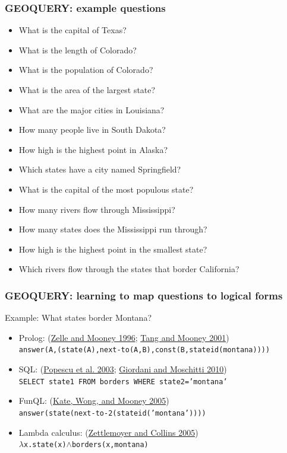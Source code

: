\documentclass[ignorenonframetext]{beamer}
\begin{document}
\begin{frame}\frametitle{GEOQUERY: example questions}
\begin{itemize}
\item What is the capital of Texas?
\item What is the length of Colorado?
\item What is the population of Colorado?
\item What is the area of the largest state?
\item What are the major cities in Louisiana?
\item How many people live in South Dakota?
\item How high is the highest point in Alaska?
\item Which states have a city named Springfield?
\item What is the capital of the most populous state?
\item How many rivers flow through Mississippi?
\item How many states does the Mississippi run through?
\item How high is the highest point in the smallest state?
\item Which rivers flow through the states that border California?
\end{itemize}
\end{frame}

\begin{frame}\frametitle{GEOQUERY: learning to map questions to logical forms}
Example: What states border Montana?
\begin{itemize}
\item Prolog:
(\href{http://aaaipress.org/Papers/AAAI/1996/AAAI96-156.pdf}{Zelle and Mooney 1996}; 
 \href{http://www.cs.utexas.edu/~ai-lab/pub-view.php?PubID=51440}{Tang and Mooney 2001})
\\ {\tt \small answer(A,(state(A),next-to(A,B),const(B,stateid(montana))))}
\item SQL:
(\href{http://homes.cs.washington.edu/~etzioni/papers/nli-iui03.pdf}{Popescu et al. 2003};
 \href{https://forum.disi.unitn.it/~moschitt/articles/NLDB09.pdf}{Giordani and Moschitti 2010})
\\ {\tt SELECT state1 FROM borders WHERE state2='montana'}
\item FunQL: 
(\href{http://www.cs.utexas.edu/~ai-lab/pub-view.php?PubID=51486}{Kate, Wong, and Mooney 2005})
\\ {\tt answer(state(next-to-2(stateid('montana'))))}
\item Lambda calculus: 
(\href{http://homes.cs.washington.edu/~lsz/papers/zc-uai05.pdf}{Zettlemoyer and Collins 2005})
\\ {\tt $\lambda$x.state(x)$\land$borders(x,montana)}
\end{itemize}
\end{frame}
\end{document}
